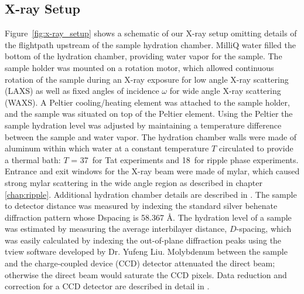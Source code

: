 \subsection{X-ray Setup}
Figure~\ref{fig:x-ray_setup} shows a schematic of our X-ray setup
omitting details of the flightpath upstream of the 
sample hydration chamber.
MilliQ water filled the bottom of the hydration chamber, providing
water vapor for the sample.
The sample holder was mounted on a rotation motor, which allowed continuous 
rotation of the sample during an X-ray exposure for low angle X-ray scattering
(\acs{LAXS}) as well as fixed angles of incidence $\omega$ for wide angle X-ray 
scattering (\acs{WAXS}).
A Peltier cooling/heating element was attached to the sample holder, and
the sample was situated on top of the Peltier element. 
Using the Peltier the sample hydration level was adjusted by maintaining
a temperature difference between the sample and water vapor. 
The hydration chamber walls were made of aluminum within which
water at a constant temperature $T$ circulated to provide a thermal bath:
$T$ = 37\textdegree\ for Tat experiments and 18\textdegree\ for ripple phase 
experiments.
Entrance and exit windows for the X-ray beam were made of mylar, which
caused strong mylar scattering in the wide angle region as described in
chapter \ref{chap:ripple}.
Additional hydration chamber details are described in \cite{Kucerka05_BPJ}.
The sample to detector distance was measured by indexing the standard 
silver behenate diffraction pattern whose \gls{Dspacing} is 58.367 \AA.
The hydration level of a sample was estimated by measuring the average 
interbilayer distance, $D$-spacing, which was easily calculated by indexing the 
out-of-plane diffraction peaks using the tview software developed by Dr. Yufeng Liu.
Molybdenum between the sample and the charge-coupled device (\acs{CCD}) detector
attenuated the direct beam; otherwise the direct beam would saturate 
the CCD pixels. 
Data reduction and correction for a CCD 
detector are described in detail in \cite{Barna99}.

